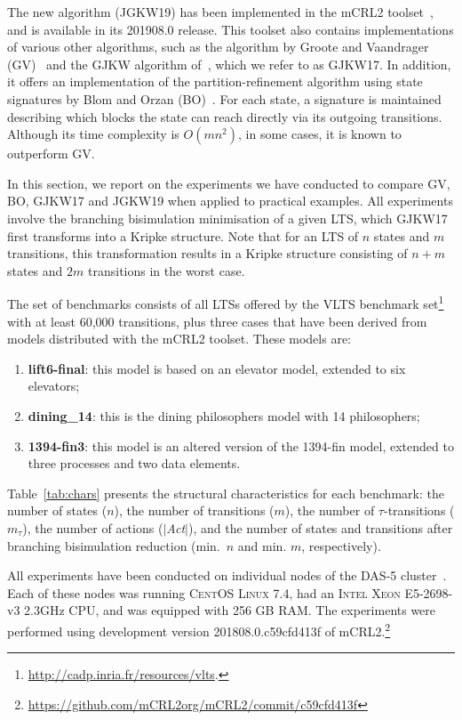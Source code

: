 \documentclass[a4paper,10pt]{article}
\theoremstyle{definition}
\theoremstyle{plain}
\begin{document}
The new algorithm (JGKW19) has been implemented in the mCRL2 toolset~\cite{DBLP:conf/tacas/BunteGKLNVWWW19}, and is available in its 201908.0 release.
This toolset also contains implementations of various other algorithms, such as the algorithm by Groote and Vaandrager (GV)~\cite{GV90}
and the GJKW algorithm of~\cite{GJKW2017}, which we refer to as GJKW17.
In addition, it offers an implementation of the partition-refinement algorithm using state signatures by Blom and Orzan (BO)~\cite{BO2003}.
For each state, a signature is maintained describing which blocks the state can reach directly via its outgoing transitions.
Although its time complexity is $O(mn^2)$, in some cases, it is known to outperform GV.

In this section, we report on the experiments we have conducted to compare GV, BO, GJKW17 and JGKW19 when applied to practical examples.
All experiments involve the branching bisimulation minimisation of a given LTS, which GJKW17 first transforms into a Kripke structure. Note that for an LTS of $n$ states and $m$ transitions, this transformation results in a Kripke structure consisting of $n + m$ states and $2m$ transitions in the worst case.

The set of benchmarks consists of all LTSs offered by the VLTS benchmark set\footnote{\url{http://cadp.inria.fr/resources/vlts}.} with at least 60,000 transitions, plus
three cases that have been derived from models distributed with the mCRL2 toolset. These models are:
\begin{enumerate}
\item \textbf{lift6-final}: this model is based on an elevator model, extended to six elevators;
\item \textbf{dining\_14}: this is the dining philosophers model with 14 philosophers;
\item \textbf{1394-fin3}: this model is an altered version of the 1394-fin model, extended to three processes and two data elements.
\end{enumerate}

Table~\ref{tab:chars} presents the structural characteristics for each benchmark: the number of states ($n$), the number of transitions ($m$), the number of $\tau$-transitions ($m_\tau$), the number of actions ($\mid$\textit{Act}$\mid$), and the number of states and transitions after branching bisimulation reduction (min.\ $n$ and min. $m$, respectively).



All experiments have been conducted on individual nodes of the DAS-5 cluster~\cite{DAS5}. Each of these nodes was running \textsc{CentOS Linux}
7.4, had an \textsc{Intel Xeon} E5-2698-v3 2.3GHz CPU, and was equipped with 256 GB RAM.
The experiments were performed using development version 201808.0.c59cfd413f of mCRL2.\footnote{\url{https://github.com/mCRL2org/mCRL2/commit/c59cfd413f}}
\end{document}
